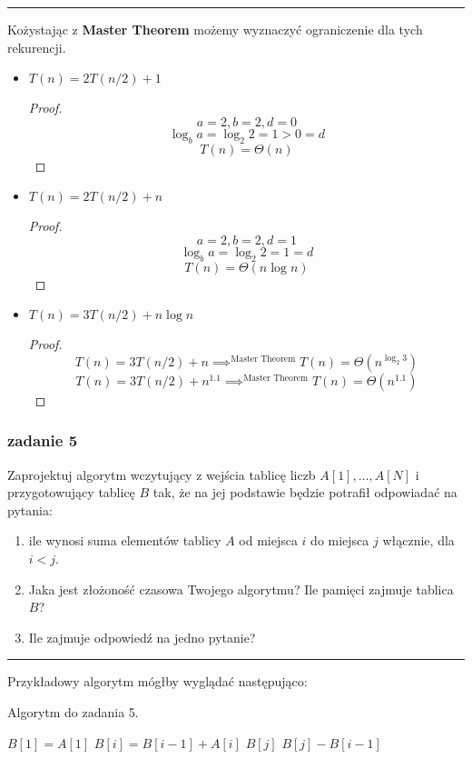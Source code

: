 \documentclass[11pt,a4paper]{article}
\begin{document}
\bigskip
\hrule
\bigskip

Kożystając z \textbf{Master Theorem} możemy wyznaczyć ograniczenie dla tych rekurencji.
\begin{itemize}
    \item $T(n) = 2T(n/2) + 1$
        \begin{proof}
            \[
                a = 2, b = 2, d = 0
            \]
            \[
                \log_b a = \log_2 2 = 1 > 0 = d
            \]
            \[
                T(n) = \Theta(n)
            \]
        \end{proof}
    \item $T(n) = 2T(n/2) + n$
        \begin{proof}
            \[
                a = 2, b = 2, d = 1
            \]
            \[
                \log_b a = \log_2 2 = 1 = d
            \]
            \[
                T(n) = \Theta(n \log n)
            \]
        \end{proof}
    \item $T(n) = 3T(n/2) + n \log n$
        \begin{proof}
            \[
                T(n) = 3T(n/2) + n \implies^{\text{Master Theorem}} T(n) = \Theta(n^{\log_2 3})
            \]
            \[
                T(n) = 3T(n/2) + n^{1.1} \implies^{\text{Master Theorem}} T(n) = \Theta(n^{1.1})
            \]
        \end{proof}
\end{itemize}

\subsubsection{zadanie 5}
Zaprojektuj algorytm wczytujący z wejścia tablicę liczb $A[1], \ldots, A[N]$ i przygotowujący tablicę $B$ tak, że na jej podstawie będzie potrafił odpowiadać na pytania:
\begin{enumerate}
    \item ile wynosi suma elementów tablicy $A$ od miejsca $i$ do miejsca $j$ włącznie, dla $i < j$.
    \item Jaka jest złożoność czasowa Twojego algorytmu? Ile pamięci zajmuje tablica $B$?
    \item Ile zajmuje odpowiedź na jedno pytanie?
\end{enumerate}

\bigskip
\hrule
\bigskip

Przykładowy algorytm mógłby wyglądać następująco:
\begin{algorithm}
    \caption{Algorytm do zadania 5.}
    \begin{algorithmic}[1]
        \State $B[1] = A[1]$
            \State $B[i] = B[i-1] + A[i]$
        \EndFor
            \State \Return $B[j]$
        \Else
            \State \Return $B[j] - B[i-1]$
        \EndIf
        \EndProcedure
    \end{algorithmic}
\end{algorithm}
\end{document}
